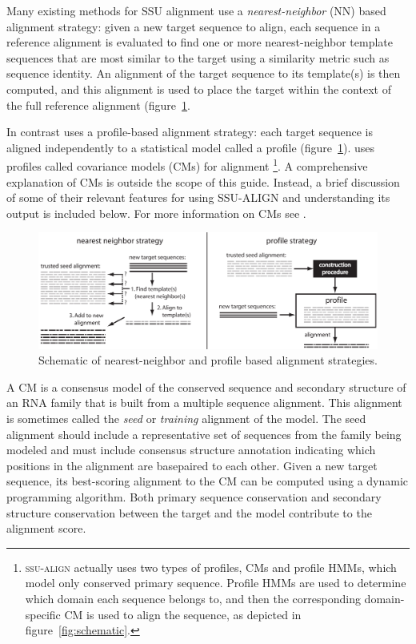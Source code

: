 Many existing methods for SSU alignment use a \emph{nearest-neighbor}
(NN) based alignment strategy: given a new target sequence to align,
each sequence in a reference alignment is evaluated to find one or
more nearest-neighbor template sequences that are most similar to the
target using a similarity metric such as sequence identity. An
alignment of the target sequence to its template(s) is then
computed, and this alignment is used to place the target within the
context of the full reference alignment (figure~\ref{fig:nnprof}.

In contrast  uses a profile-based alignment
strategy: each target sequence is aligned independently to a
statistical model called a profile
(figure~\ref{fig:nnprof}).  uses profiles called
covariance models (CMs) for alignment
\footnote{\textsc{ssu-align} actually uses two types of profiles,
  CMs and profile HMMs, which model only conserved primary
  sequence. Profile HMMs are used to determine which domain each
  sequence belongs to, and then the corresponding domain-specific CM
  is used to align the sequence, as depicted in
  figure~\ref{fig:schematic}.}.
A comprehensive explanation of CMs is outside the scope of this
guide. Instead, a brief discussion of some of their relevant features
for using \textsc{SSU-ALIGN} and understanding its output is included
below. For more information on CMs see
\cite{Eddy94,Durbin98,Eddy02b,NawrockiEddy07,Nawrocki09,Nawrocki09b,KolbeEddy09}.

\begin{figure}
  \begin{center}
\includegraphics[width=6in]{Figures/nnprof}
  \end{center}
  \caption{Schematic of nearest-neighbor and
        profile based alignment strategies.}
  \label{fig:nnprof}
\end{figure}

A CM is a consensus model of the conserved sequence and secondary
structure of an RNA family that is built from a multiple sequence
alignment. This alignment is sometimes called the \emph{seed} or
\emph{training} alignment of the model. The seed alignment should
include a representative set of sequences from the family being
modeled and must include consensus structure annotation indicating
which positions in the alignment are basepaired to each other.  Given
a new target sequence, its best-scoring alignment to the CM can be
computed using a dynamic programming algorithm. Both primary
sequence conservation and secondary structure conservation between the target
and the model contribute to the alignment score.

